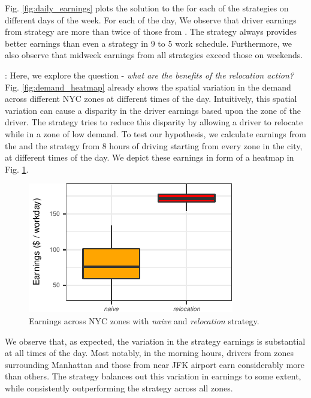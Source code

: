Fig. \ref{fig:daily_earnings} plots the solution to the {\originalproblem} for each of the strategies on different days of the week. For each of the day, We observe that driver earnings from {\relocationflexible} strategy are more than twice of those from {\naive}. The {\flexible} strategy always provides better earnings than even a {\relocation} strategy in 9 to 5 work schedule. Furthermore, we also observe that midweek earnings from all strategies exceed those on weekends.

: Here, we explore the question - \textit{what are the benefits of the relocation action?} Fig. \ref{fig:demand_heatmap} already shows the spatial variation in the demand across different NYC zones at different times of the day. Intuitively, this spatial variation can cause a disparity in the driver earnings based upon the zone of the driver. The {\relocation} strategy tries to reduce this disparity by allowing a driver to relocate while in a zone of low demand. To test our hypothesis, we calculate earnings from the {\naive} and the {\relocation} strategy from 8 hours of driving starting from every zone in the city, at different times of the day. We depict these earnings in form of a heatmap in Fig. \ref{fig:earnings_heatmap}.

\begin{figure}[hb]
	\caption{Earnings across NYC zones with \textit{naive} and \textit{relocation} strategy.}
	\label{fig:earnings_heatmap}
	\includegraphics[scale=0.4]{figures/earnings_heatmap.pdf}
\end{figure}

We observe that, as expected, the variation in the {\naive} strategy earnings is substantial at all times of the day. Most notably, in the morning hours, drivers from zones surrounding Manhattan and those from near JFK airport earn considerably more than others. The {\relocation} strategy balances out this variation in earnings to some extent, while consistently outperforming the {\naive} strategy across all zones.


